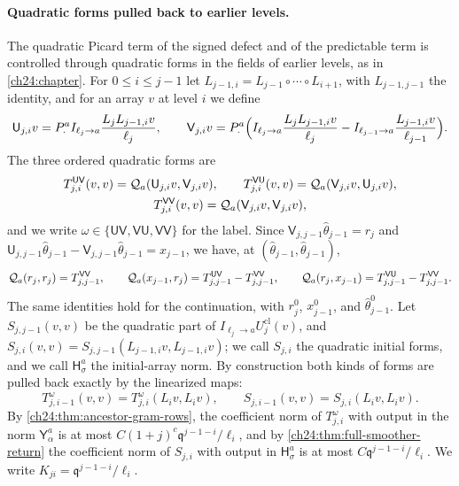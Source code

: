 \paragraph{Quadratic forms pulled back to earlier levels.} The quadratic Picard term of the signed defect and of the predictable term is controlled through quadratic forms in the fields of earlier levels, as in \cref{ch24:chapter}. For $0\le i\le j-1$ let $L_{j-1,i}=L_{j-1}\circ\cdots\circ L_{i+1}$, with $L_{j-1,j-1}$ the identity, and for an array $v$ at level $i$ we define
\[
 \mathsf U_{j,i}v=P_\cdot^aI_{\ell_j\to a}\frac{L_jL_{j-1,i}v}{\ell_j},\qquad
 \mathsf V_{j,i}v=P_\cdot^a\Bigl(I_{\ell_j\to a}\frac{L_jL_{j-1,i}v}{\ell_j}-I_{\ell_{j-1}\to a}\frac{L_{j-1,i}v}{\ell_{j-1}}\Bigr).
\]
The three ordered quadratic forms are
\[
 \begin{gathered}
 T^{\mathsf{UV}}_{j,i}(v,v)=\mathcal Q_{a}(\mathsf U_{j,i}v,\mathsf V_{j,i}v),\qquad
 T^{\mathsf{VU}}_{j,i}(v,v)=\mathcal Q_{a}(\mathsf V_{j,i}v,\mathsf U_{j,i}v),\\
 T^{\mathsf{VV}}_{j,i}(v,v)=\mathcal Q_{a}(\mathsf V_{j,i}v,\mathsf V_{j,i}v),
 \end{gathered}
\]
and we write $\omega\in\{\mathsf{UV},\mathsf{VU},\mathsf{VV}\}$ for the label. Since $\mathsf V_{j,j-1}\widehat\theta_{j-1}=r_j$ and $\mathsf U_{j,j-1}\widehat\theta_{j-1}-\mathsf V_{j,j-1}\widehat\theta_{j-1}=x_{j-1}$, we have, at $(\widehat\theta_{j-1},\widehat\theta_{j-1})$,
\begin{equation}\label{ch30:eq:three-forms}
 \mathcal Q_{a}(r_j,r_j)=T^{\mathsf{VV}}_{j,j-1},\qquad
 \mathcal Q_{a}(x_{j-1},r_j)=T^{\mathsf{UV}}_{j,j-1}-T^{\mathsf{VV}}_{j,j-1},\qquad
 \mathcal Q_{a}(r_j,x_{j-1})=T^{\mathsf{VU}}_{j,j-1}-T^{\mathsf{VV}}_{j,j-1}.
\end{equation}
The same identities hold for the continuation, with $r_j^0$, $x^0_{j-1}$, and $\widehat\theta_{j-1}^0$. Let $S_{j,j-1}(v,v)$ be the quadratic part of $I_{\ell_j\to a}U_j^{\mathrm{cl}}(v)$, and $S_{j,i}(v,v)=S_{j,j-1}(L_{j-1,i}v,L_{j-1,i}v)$; we call $S_{j,i}$ the quadratic initial forms, and we call $\mathsf H_\sigma^a$ the initial-array norm. By construction both kinds of forms are pulled back exactly by the linearized maps:
\begin{equation}\label{ch30:eq:pullback}
 T^\omega_{j,i-1}(v,v)=T^\omega_{j,i}(L_iv,L_iv),\qquad S_{j,i-1}(v,v)=S_{j,i}(L_iv,L_iv).
\end{equation}
By \cref{ch24:thm:ancestor-gram-rows}, the coefficient norm of $T^\omega_{j,i}$ with output in the norm $\mathsf Y_\alpha^a$ is at most $C(1+j)^c\mathfrak q^{j-1-i}/\ell_i$, and by \cref{ch24:thm:full-smoother-return} the coefficient norm of $S_{j,i}$ with output in $\mathsf H_\sigma^a$ is at most $C\mathfrak q^{j-1-i}/\ell_i$. We write $K_{ji}=\mathfrak q^{j-1-i}/\ell_i$.

